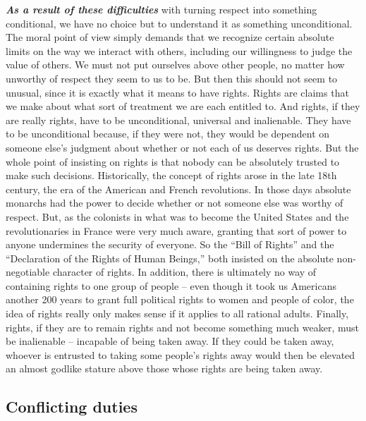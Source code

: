 \documentclass[
  12pt, openany]{book}
\theoremstyle{definition}
\theoremstyle{definition}
\theoremstyle{definition}
\theoremstyle{definition}
\theoremstyle{remark}
\begin{document}
\textbf{\emph{As a result of these difficulties}} with turning respect into something conditional, we have no choice but to understand it as something unconditional. The moral point of view simply demands that we recognize certain absolute limits on the way we interact with others, including our willingness to judge the value of others. We must not put ourselves above other people, no matter how unworthy of respect they seem to us to be. But then this should not seem to unusual, since it is exactly what it means to have rights. Rights are claims that we make about what sort of treatment we are each entitled to. And rights, if they are really rights, have to be unconditional, universal and inalienable. They have to be unconditional because, if they were not, they would be dependent on someone else's judgment about whether or not each of us deserves rights. But the whole point of insisting on rights is that nobody can be absolutely trusted to make such decisions. Historically, the concept of rights arose in the late 18th century, the era of the American and French revolutions. In those days absolute monarchs had the power to decide whether or not someone else was worthy of respect. But, as the colonists in what was to become the United States and the revolutionaries in France were very much aware, granting that sort of power to anyone undermines the security of everyone. So the ``Bill of Rights'' and the ``Declaration of the Rights of Human Beings,'' both insisted on the absolute non-negotiable character of rights. In addition, there is ultimately no way of containing rights to one group of people -- even though it took us Americans another 200 years to grant full political rights to women and people of color, the idea of rights really only makes sense if it applies to all rational adults. Finally, rights, if they are to remain rights and not become something much weaker, must be inalienable -- incapable of being taken away. If they could be taken away, whoever is entrusted to taking some people's rights away would then be elevated an almost godlike stature above those whose rights are being taken away.

\hypertarget{conflicting-duties}{%
\subsection*{Conflicting duties}\label{conflicting-duties}}
\end{document}
